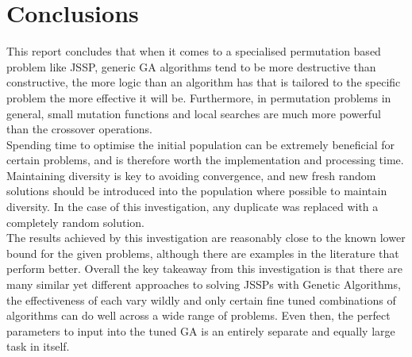 \documentclass[14pt]{acmsiggraph}
\begin{document}
	\section{Conclusions}
	This report concludes that when it comes to a specialised permutation based problem like JSSP, generic GA algorithms tend to be more destructive than constructive, the more logic than an algorithm has that is tailored to the specific problem the more effective it will be. Furthermore, in permutation problems in general, small mutation functions and local searches are much more powerful than the crossover operations.\\
	Spending time to optimise the initial population can be extremely beneficial for certain problems, and is therefore worth the  implementation and processing time.\\
	Maintaining diversity is key to avoiding convergence, and new fresh random solutions should be introduced into the population where possible to maintain diversity. In the case of this investigation, any duplicate was replaced with a completely random solution.\\
	The results achieved by this investigation are reasonably close to the known lower bound for the given problems, although there are examples in the literature that perform better. Overall the key takeaway from this investigation is that there are many similar yet different approaches to solving JSSPs with Genetic Algorithms, the effectiveness of each vary wildly and only certain fine tuned combinations of algorithms can do well across a wide range of problems. Even then, the perfect parameters to input into the tuned GA is an entirely separate and equally large task in itself.
	
	
	
	
\end{document}
